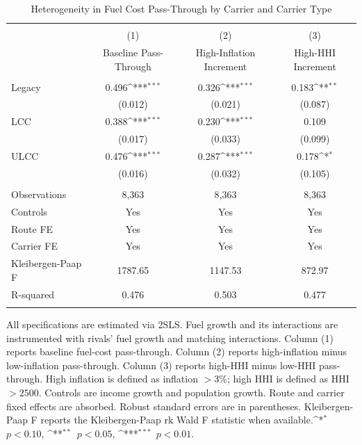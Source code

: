 \begin{table}[p]
\centering
\caption{Heterogeneity in Fuel Cost Pass-Through by Carrier and Carrier Type}
\label{tab:carrier_heterogeneity}
\scriptsize
\setlength{\tabcolsep}{2pt}
\renewcommand{\arraystretch}{0.9}
\def\sym#1{\ifmmode^{#1}\else\(^{#1}\)\fi}
\begin{tabular}{l*{3}{c}}
\\[-1.8ex]\hline
\hline \\[-1.8ex]
            &\multicolumn{1}{c}{(1)}&\multicolumn{1}{c}{(2)}&\multicolumn{1}{c}{(3)}\\
            &\multicolumn{1}{c}{Baseline Pass-Through}&\multicolumn{1}{c}{High-Inflation Increment}&\multicolumn{1}{c}{High-HHI Increment}\\
\hline \\[-1.8ex]
Legacy & 0.496\sym{***} & 0.326\sym{***} & 0.183\sym{**} \\
            & (0.012) & (0.021) & (0.087) \\
LCC & 0.388\sym{***} & 0.230\sym{***} & 0.109 \\
            & (0.017) & (0.033) & (0.099) \\
ULCC & 0.476\sym{***} & 0.287\sym{***} & 0.178\sym{*} \\
            & (0.016) & (0.032) & (0.105) \\
\hline \\[-1.8ex]
Observations & 8,363 & 8,363 & 8,363 \\
Controls & Yes & Yes & Yes \\
Route FE & Yes & Yes & Yes \\
Carrier FE & Yes & Yes & Yes \\
Kleibergen-Paap F & 1787.65 & 1147.53 & 872.97 \\
R-squared & 0.476 & 0.503 & 0.477 \\
\hline \\[-1.8ex]
\end{tabular}
\begin{tablenotes}[Note]
All specifications are estimated via 2SLS. Fuel growth and its interactions are instrumented with rivals' fuel growth and matching interactions. Column (1) reports baseline fuel-cost pass-through. Column (2) reports high-inflation minus low-inflation pass-through. Column (3) reports high-HHI minus low-HHI pass-through. High inflation is defined as inflation $>3\%$; high HHI is defined as HHI $>2500$. Controls are income growth and population growth. Route and carrier fixed effects are absorbed. Robust standard errors are in parentheses. Kleibergen-Paap F reports the Kleibergen-Paap rk Wald F statistic when available.\sym{*}~$p<0.10$, \sym{**}~$p<0.05$, \sym{***}~$p<0.01$.
\end{tablenotes}
\end{table}
